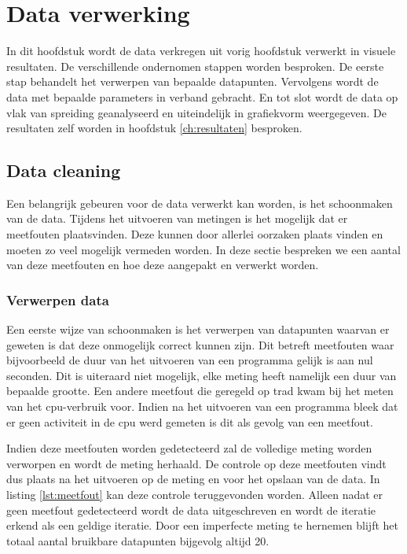 \chapter{Data verwerking}
In dit hoofdstuk wordt de data verkregen uit vorig hoofdstuk verwerkt in visuele resultaten. De verschillende ondernomen stappen worden besproken. De eerste stap behandelt het verwerpen van bepaalde datapunten. Vervolgens wordt de data met bepaalde parameters in verband gebracht. En tot slot wordt de data op vlak van spreiding geanalyseerd en uiteindelijk in grafiekvorm weergegeven. De resultaten zelf worden in hoofdstuk \ref{ch:resultaten} besproken. 

\section{Data cleaning}
Een belangrijk gebeuren voor de data verwerkt kan worden, is het schoonmaken van de data. Tijdens het uitvoeren van metingen is het mogelijk dat er meetfouten plaatsvinden. Deze kunnen door allerlei oorzaken plaats vinden en moeten zo veel mogelijk vermeden worden. In deze sectie bespreken we een aantal van deze meetfouten en hoe deze aangepakt en verwerkt worden. 
	\subsection{Verwerpen data}
	Een eerste wijze van schoonmaken is het verwerpen van datapunten waarvan er geweten is dat deze onmogelijk correct kunnen zijn. Dit betreft meetfouten waar bijvoorbeeld de duur van het uitvoeren van een programma gelijk is aan nul seconden. Dit is uiteraard niet mogelijk, elke meting heeft namelijk een duur van bepaalde grootte. Een andere meetfout die geregeld op trad kwam bij het meten van het \gls{cpu}-verbruik voor. Indien na het uitvoeren van een programma bleek dat er geen activiteit in de \gls{cpu} werd gemeten is dit als gevolg van een meetfout. 
	
	Indien deze meetfouten worden gedetecteerd zal de volledige meting worden verworpen en wordt de meting herhaald. De controle op deze meetfouten vindt dus plaats na het uitvoeren op de meting en voor het opslaan van de data. In listing \ref{lst:meetfout} kan deze controle teruggevonden worden. Alleen nadat er geen meetfout gedetecteerd wordt de data uitgeschreven en wordt de iteratie erkend als een geldige iteratie. Door een imperfecte meting te hernemen blijft het totaal aantal bruikbare datapunten bijgevolg altijd 20.
	
